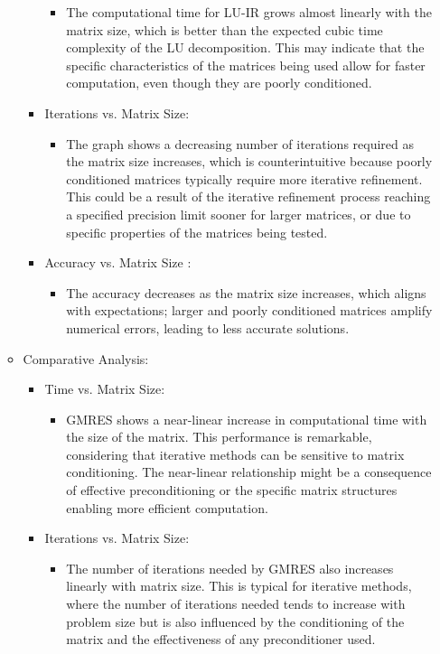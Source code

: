 \begin{enumerate}
\begin{itemize}
\begin{itemize}
\begin{itemize}
                \item The computational time for LU-IR grows almost linearly with the matrix size, which is better than the expected cubic time complexity of the LU decomposition. This may indicate that the specific characteristics of the matrices being used allow for faster computation, even though they are poorly conditioned.
            \end{itemize}
           \item Iterations vs. Matrix Size:
           \begin{itemize}
               \item The graph shows a decreasing number of iterations required as the matrix size increases, which is counterintuitive because poorly conditioned matrices typically require more iterative refinement. This could be a result of the iterative refinement process reaching a specified precision limit sooner for larger matrices, or due to specific properties of the matrices being tested.
           \end{itemize}
           \item Accuracy vs. Matrix Size :
           \begin{itemize}
               \item The accuracy decreases as the matrix size increases, which aligns with expectations; larger and poorly conditioned matrices amplify numerical errors, leading to less accurate solutions.
           \end{itemize}
        \end{itemize}
        \item Comparative Analysis:
        \begin{itemize}
            \item Time vs. Matrix Size:
            \begin{itemize}
                \item GMRES shows a near-linear increase in computational time with the size of the matrix. This performance is remarkable, considering that iterative methods can be sensitive to matrix conditioning. The near-linear relationship might be a consequence of effective preconditioning or the specific matrix structures enabling more efficient computation.
            \end{itemize}
            \item Iterations vs. Matrix Size:
            \begin{itemize}
                \item The number of iterations needed by GMRES also increases linearly with matrix size. This is typical for iterative methods, where the number of iterations needed tends to increase with problem size but is also influenced by the conditioning of the matrix and the effectiveness of any preconditioner used.

\end{itemize}
\end{itemize}
\end{itemize}
\end{enumerate}
